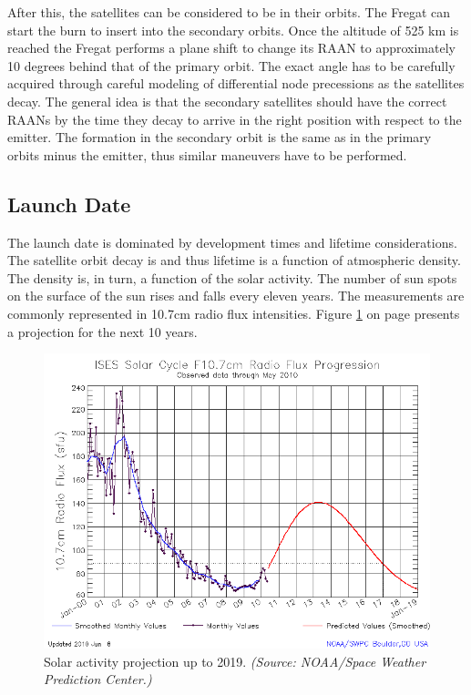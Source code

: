 After this, the satellites can be considered to be in their orbits. The Fregat can start the burn to insert into the secondary orbits. Once the altitude of 525 km is reached the Fregat performs a plane shift to change its \ac{RAAN} to approximately 10 degrees behind that of the primary orbit. The exact angle has to be carefully acquired through careful modeling of differential node precessions as the satellites decay. The general idea is that the secondary satellites should have the correct RAANs by the time they decay to arrive in the right position with respect to the emitter.  The formation in the secondary orbit is the same as in the primary orbits minus the emitter, thus similar maneuvers have to be performed.

\subsection{Launch Date}
\label{frLSLD}

The launch date is dominated by development times and lifetime considerations. The satellite orbit decay is and thus lifetime is a function of atmospheric density. The density is, in turn, a function of the solar activity. The number of sun spots on the surface of the sun rises and falls every eleven years. The measurements are commonly represented in 10.7cm radio flux intensities. Figure \ref{fig:f10.7} on page \pageref{fig:f10.7} presents a projection for the next 10 years.

\begin{figure}[!h]
\centering
\includegraphics[width=1.0\textwidth, angle=0]{chapters/img/solarCycle.png}
\caption{Solar activity projection up to 2019. \emph{(Source: NOAA/Space Weather Prediction Center.)} }
\label{fig:f10.7}
\end{figure}

